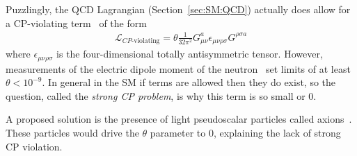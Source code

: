 Puzzlingly, the QCD Lagrangian (Section~\ref{sec:SM:QCD}) actually does allow for a CP-violating term~\cite{Dine:2000cj} of the form
\begin{align}
\mathcal{L}_\text{$CP$-violating} = \theta \frac{1}{32\pi^2}G_{\mu\nu}^a\epsilon_{\mu\nu\rho\sigma}G^{\rho\sigma a}
\end{align}
where $\epsilon_{\mu\nu\rho\sigma}$ is the four-dimensional totally antisymmetric tensor.
However, measurements of the electric dipole moment of the neutron~\cite{Baker:2006ts} set limits of at least $\theta < 10^{-9}$.
In general in the SM if terms are allowed then they do exist, so the question, called the \textit{strong CP problem}, is why this term is so small or $0$.

A proposed solution is the presence of light pseudoscalar particles called axions~\cite{Peccei:1977hh,Baluni:1978rf,Crewther:1979pi,Peccei:1977ur,Weinberg:1977ma,Wilczek:1977pj}.
These particles would drive the $\theta$ parameter to $0$, explaining the lack of strong CP violation.

